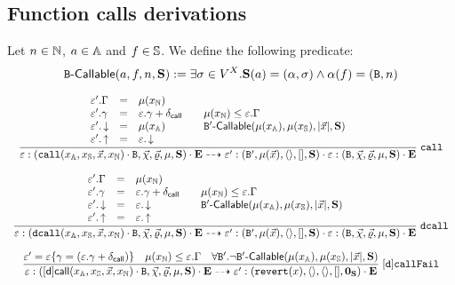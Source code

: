 \subsection{Function calls derivations}
\def\callable#1{#1\hbox{\--}\mathsf{Callable}}
Let $n \in\mathbb{N}$, $a\in\mathbb{A}$ and $f\in\mathbb{S}$. We define the following predicate:
$$
\callable{\Byt}(a,f,n,\Block) := \exists \sigma\in V^X.\Block(a)=(\Abi,\sigma) \wedge \Abi(f)= (\Byt,n) 
$$

\begin{table}[ht]
$$
\begin{array}{c}
\dfrac{
    \begin{array}{lll}
        \env'.\gasmax &=& \mu(x_\Nat) \\
        \env'.\gasspent &=& \env.\gasspent + \dcl \\
        \env'.\this & = & \mu(x_\Addr) \\
        \env'.\sender & = & \env.\this
    \end{array}
    \quad
    \begin{array}{l}
        \mu(x_\Nat) \leq \env.\gasmax \\
        \callable{\Byt'}(\mu(x_\Addr),\mu(x_\Str),|\vec x|,\Block)
    \end{array}
}
{
 \env:(\call{x_\Addr,x_\Str,\vec x, x_\Nat}\cdot\Byt,\callData, \retData, \mu, \Block)\cdot\Exec 
 \rar 
 \env':(\Byt',\mu(\vec x), \zVec, \zVal,\Block)\cdot\env:(\Byt, \callData, \retData, \mu, \Block)\cdot\Exec
}\rlab{call}
\\\\
\dfrac{
    \begin{array}{lll}
        \env'.\gasmax &=& \mu(x_\Nat) \\
        \env'.\gasspent &=& \env.\gasspent + \dcl \\
        \env'.\this & = & \env.\this \\
        \env'.\sender & = & \env.\sender
    \end{array}
    \quad 
    \begin{array}{l}
        \mu(x_\Nat) \leq \env.\gasmax \\
        \callable{\Byt'}(\mu(x_\Addr),\mu(x_\Str),|\vec x|, \Block)
    \end{array} 
}
{
 \env:(\dcall{x_\Addr,x_\Str,\vec x, x_\Nat}\cdot\Byt, \callData, \retData, \mu, \Block)\cdot\Exec 
 \rar 
 \env':(\Byt', \mu(\vec x), \zVec, \zVal,\Block)\cdot\env:(\Byt, \callData, \retData,\mu, \Block)\cdot\Exec
}\rlab{dcall}
\\\\
\dfrac{
\env' = \env\set{\gasspent = (\env.\gasspent + \dcl)}
\quad 
\mu(x_\Nat) \leq \env.\gasmax \quad
\forall\Byt'.\neg\callable{\Byt'}(\mu(x_\Addr),\mu(x_\Str),|\vec x|,\Block) 
}
{
 \env:(\mathsf{[d]call}(x_\Addr, x_\Str, \vec x, x_\Nat)\cdot\Byt, \callData,\retData,\mu, \Block)\cdot\Exec 
 \rar 
 \env': (\revert{x}, \zVec,\zVec,\zVal, \z_\Block)\cdot\Exec
}\rlab{[d]callFail}

\end{array}
$$
\caption{Call and delegate call derivations}
\end{table}
